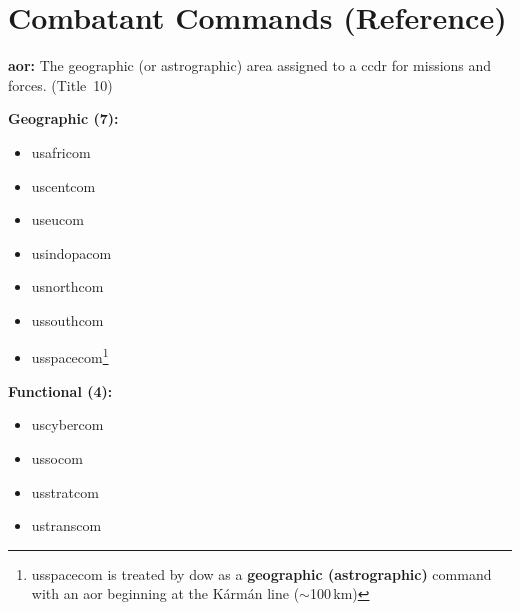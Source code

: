 \documentclass[../main.tex]{subfiles}
\begin{document}
\section{Combatant Commands (Reference)}
\noindent\textbf{\ac{aor}:} The geographic (or astrographic) area assigned to a \ac{ccdr} for missions and forces. (Title~10) %

\textbf{Geographic (7):}
\begin{itemize}
\item \ac{usafricom}
\item \ac{uscentcom}
\item \ac{useucom}
\item \ac{usindopacom}
\item \ac{usnorthcom}
\item \ac{ussouthcom}
\item \ac{usspacecom}\footnote{\ac{usspacecom} is treated by \ac{dow} as a \textbf{geographic (astrographic)} command with an \ac{aor} beginning at the K\'{a}rm\'{a}n line ($\sim$100\,km)}
\end{itemize}
\textbf{Functional (4):}
\begin{itemize}
\item \ac{uscybercom}
\item \ac{ussocom}
\item \ac{usstratcom}
\item \ac{ustranscom}
\end{itemize}
\end{document}
